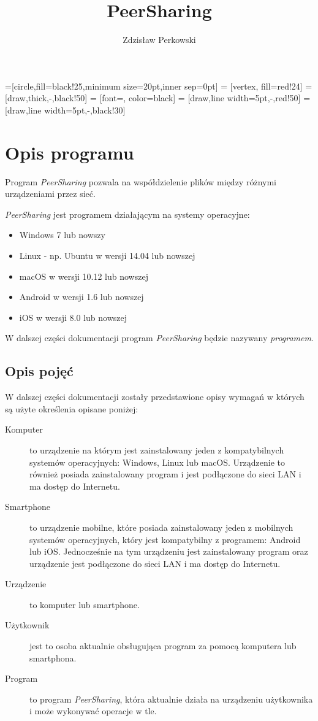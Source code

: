 \documentclass[12pt,a4paper]{article}
\author{Zdzisław Perkowski}
\title{PeerSharing}
\begin{document}
=[circle,fill=black!25,minimum size=20pt,inner sep=0pt]
 = [vertex, fill=red!24]
 = [draw,thick,-,black!50]
 = [font=\tiny, color=black]
 = [draw,line width=5pt,-,red!50]
 = [draw,line width=5pt,-,black!30]

\maketitle
\tableofcontents
\pagebreak


\section{Opis programu}

Program \textit{PeerSharing} pozwala na współdzielenie plików między różnymi urządzeniami przez sieć.

\textit{PeerSharing} jest programem działającym na systemy operacyjne:
\begin{itemize}
	\item Windows 7 lub nowszy
	\item Linux - np. Ubuntu w wersji 14.04 lub nowszej
	\item macOS w wersji 10.12 lub nowszej
	\item Android w wersji 1.6 lub nowszej
	\item iOS w wersji 8.0 lub nowszej
\end{itemize}

W dalszej części dokumentacji program \textit{PeerSharing} będzie nazywany \textit{programem}.

\subsection{Opis pojęć}

W dalszej części dokumentacji zostały przedstawione opisy wymagań w których są użyte określenia opisane poniżej:

\begin{description}
	\item[Komputer] to urządzenie na którym jest zainstalowany jeden z kompatybilnych systemów operacyjnych: Windows, Linux lub macOS. Urządzenie to również posiada zainstalowany program i jest podłączone do sieci LAN i ma dostęp do Internetu.
	\item[Smartphone] to urządzenie mobilne, które posiada zainstalowany jeden z mobilnych systemów operacyjnych, który jest kompatybilny z programem: Android lub iOS. Jednocześnie na tym urządzeniu jest zainstalowany program oraz urządzenie jest podłączone do sieci LAN i ma dostęp do Internetu.
	\item[Urządzenie] to komputer lub smartphone.
	\item[Użytkownik] jest to osoba aktualnie obsługująca program za pomocą komputera lub smartphona.
	\item[Program] to program \textit{PeerSharing}, która aktualnie działa na urządzeniu użytkownika i może wykonywać operacje w tle.

\end{description}
\end{document}
